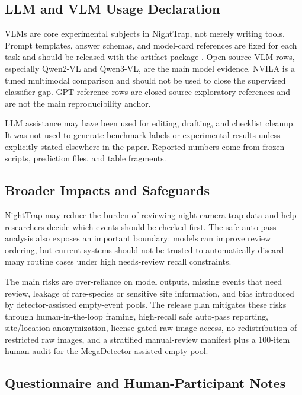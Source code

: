 \documentclass{article}
\begin{document}
\subsection{LLM and VLM Usage Declaration}

VLMs are core experimental subjects in NightTrap, not merely writing tools. Prompt templates, answer schemas, and model-card references are fixed for each task and should be released with the artifact package \citep{mitchell2019modelcards}. Open-source VLM rows, especially Qwen2-VL and Qwen3-VL, are the main model evidence. NVILA is a tuned multimodal comparison and should not be used to close the supervised classifier gap. GPT reference rows are closed-source exploratory references and are not the main reproducibility anchor.

LLM assistance may have been used for editing, drafting, and checklist cleanup. It was not used to generate benchmark labels or experimental results unless explicitly stated elsewhere in the paper. Reported numbers come from frozen scripts, prediction files, and table fragments.

\subsection{Broader Impacts and Safeguards}

NightTrap may reduce the burden of reviewing night camera-trap data and help researchers decide which events should be checked first. The safe auto-pass analysis also exposes an important boundary: models can improve review ordering, but current systems should not be trusted to automatically discard many routine cases under high needs-review recall constraints.

The main risks are over-reliance on model outputs, missing events that need review, leakage of rare-species or sensitive site information, and bias introduced by detector-assisted empty-event pools. The release plan mitigates these risks through human-in-the-loop framing, high-recall safe auto-pass reporting, site/location anonymization, license-gated raw-image access, no redistribution of restricted raw images, and a stratified manual-review manifest plus a 100-item human audit for the MegaDetector-assisted empty pool.

\subsection{Questionnaire and Human-Participant Notes}
\end{document}
